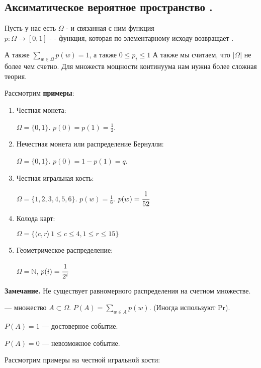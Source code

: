 \subsection{Аксиматическое вероятное пространство .}

Пусть у нас есть $\Omega$ -  и связанная с ним функция \\ $p: \Omega \rightarrow [0,1]$  -  - функция, которая по элементарному исходу возвращает .

А также $\sum\limits_{w \in \Omega} p(w) = 1$, а также $0 \leq p_i \leq 1$  А также мы считаем, что $|\Omega|$ не более чем счетно. Для множеств мощности континуума нам нужна более сложная теория.  

Рассмотрим \textbf{примеры}:

\begin{enumerate}
    \item {Честная монета:}

    $\Omega = \{0,1\}$. $p(0) = p(1) = \frac{1}{2}$.

    \item {Нечестная монета} или распределение Бернулли:
    
    $\Omega = \{0,1\}$. $p(0) = 1 - p(1) = q$.

     \item {Честная игральная кость:}

    $\Omega = \{1,2,3,4,5,6\}$. $p(w) = \frac{1}{6}$. $p(w) = \cfrac{1}{52}$

    \item Колода карт:

    $\Omega = \{\langle c, r\rangle\, 1\leq c \leq 4, 1\leq r \leq 15\}$

    \item Геометрическое распределение:

    $\Omega = \mathbb{N}$, $p(i) = \cfrac{1}{2^i}$
    
\end{enumerate}

\textbf{Замечание.} Не существует равномерного распределения на счетном множестве.

 ---  множество $A \subset \Omega$. $P(A) = \sum\limits_{w \in A} p(w)$. (Иногда используют Pr).

$P(A) = 1 $ --- достоверное событие.

$P(A) = 0 $ --- невозможное событие.

Рассмотрим примеры на честной игральной кости:


